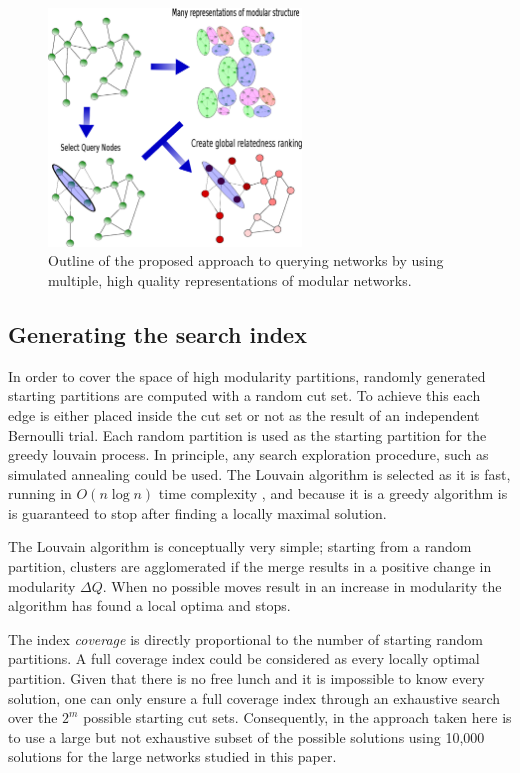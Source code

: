 \documentclass[manuscript, proceedings]{acmart}
\begin{document}
\begin{figure}
 \centering
 \includegraphics[width=0.6\textwidth]{images/meth_fig/fig1_desc.eps}
 \caption{Outline of the proposed approach to querying networks by using multiple, high quality representations of modular networks.}
 \label{fig:algorithm_outline}
\end{figure}


\subsection{Generating the search index}
In order to cover the space of high modularity partitions, randomly generated starting partitions are computed with a random cut set.
To achieve this each edge is either placed inside the cut set or not as the result of an independent Bernoulli trial. 
Each random partition is used as the starting partition for the greedy louvain process.
In principle, any search exploration procedure, such as simulated annealing \cite{GuimeraNature2005} could be used.
The Louvain algorithm is selected as it is fast, running in $O(n \log n)$ time complexity \cite{blondel2008fast}, and because it is a greedy algorithm is is guaranteed to stop after finding a locally maximal solution.

The Louvain algorithm is conceptually very simple; starting from a random partition, clusters are agglomerated if the merge results in a positive change in modularity $\Delta Q$.
When no possible moves result in an increase in modularity the algorithm has found a local optima and stops.

The index \textit{coverage} is directly proportional to the number of starting random partitions.
A full coverage index could be considered as every locally optimal partition.
Given that there is no free lunch and it is impossible to know every solution, one can only ensure a full coverage index through an exhaustive search over the $2^m$ possible starting cut sets.
Consequently, in the approach taken here is to use a large but not exhaustive subset of the possible solutions using 10,000 solutions for the large networks studied in this paper.
\end{document}

